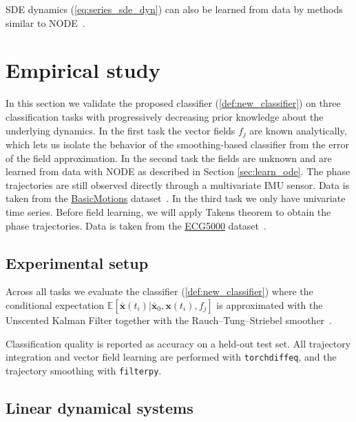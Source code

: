 \documentclass[referee, pdflatex, sn-mathphys-num]{sn-jnl}
\theoremstyle{definition}
\theoremstyle{plain}
\newcommand{\bx}{\ensuremath{\mathbf{x}}}
\newcommand{\bbx}{\ensuremath{\bar{\mathbf{x}}}}
\begin{document}
	SDE dynamics (\ref{eq:series_sde_dyn}) can also be learned from data by methods similar to NODE~\cite{pmlr-v108-li20i, NEURIPS2021_9ba196c7}.
	
	\section{Empirical study}\label{Experiment}
	
	In this section we validate the proposed classifier (\ref{def:new_classifier}) on three classification tasks with progressively decreasing prior knowledge about the underlying dynamics. In the first task the vector fields $f_j$ are known analytically, which lets us isolate the behavior of the smoothing-based classifier from the error of the field approximation. In the second task the fields are unknown and are learned from data with NODE as described in Section \ref{sec:learn_ode}. The phase trajectories are still observed directly through a multivariate IMU sensor. Data is taken from the \href{https://www.timeseriesclassification.com/description.php?Dataset=BasicMotions}{BasicMotions} dataset~\cite{Malekzadeh:2019:MSD:3302505.3310068}. In the third task we only have univariate time series. Before field learning, we will apply Takens theorem to obtain the phase trajectories. Data is taken from the \href{https://www.timeseriesclassification.com/description.php?Dataset=ECG5000}{ECG5000} dataset~\cite{Malekzadeh:2019:MSD:3302505.3310068}.
	
	\subsection{Experimental setup}\label{sec:exp_setup}
	
	Across all tasks we evaluate the classifier (\ref{def:new_classifier}) where the conditional expectation $\mathbb{E}[\bbx(t_i) | \bbx_0, \bx(t_i), f_j]$ is approximated with the Unscented Kalman Filter together with the Rauch--Tung--Striebel smoother~\cite{bayes_filter_smooth}.
	
	Classification quality is reported as accuracy on a held-out test set. All trajectory integration and vector field learning are performed with \texttt{torchdiffeq}, and the trajectory smoothing with \texttt{filterpy}.
	
	\subsection{Linear dynamical systems}\label{sec:exp_chaotic}
	
\end{document}
